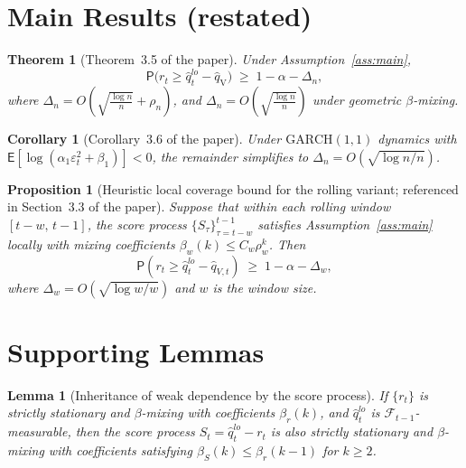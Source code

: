 \documentclass[11pt]{article}
\newcommand{\E}{\mathsf{E}}
\renewcommand{\P}{\mathsf{P}}
\newcommand{\qV}{\hat{q}_{\scriptscriptstyle\mathrm{V}}}
\newtheorem{theorem}{Theorem}
\newtheorem{corollary}{Corollary}
\newtheorem{proposition}{Proposition}
\newtheorem{lemma}{Lemma}
\begin{document}
\section{Main Results (restated)}

\begin{theorem}[Theorem~3.5 of the paper]
\label{thm:dependent_conformal_var}
Under Assumption~\ref{ass:main},
\[
\P\big(r_{t} \geq \hat{q}_t^{lo} - \qV\big)
\;\geq\; 1 - \alpha - \Delta_n,
\]
where $\Delta_n
= O\!\left(\sqrt{\tfrac{\log n}{n}} + \rho_n\right)$, and
$\Delta_n = O\!\left(\sqrt{\tfrac{\log n}{n}}\right)$ under
geometric $\beta$-mixing.
\end{theorem}

\begin{corollary}[Corollary~3.6 of the paper]
\label{cor:garch_conformal_var}
Under $\mathrm{GARCH}(1,1)$ dynamics with
$\E[\log(\alpha_1 \varepsilon_t^2 + \beta_1)] < 0$, the remainder
simplifies to $\Delta_n = O(\sqrt{\log n / n})$.
\end{corollary}

\begin{proposition}[Heuristic local coverage bound for the rolling
variant; referenced in Section~3.3 of the paper]
\label{prop:rolling_coverage}
Suppose that within each rolling window $[t-w,\,t-1]$, the score
process $\{S_\tau\}_{\tau=t-w}^{t-1}$ satisfies
Assumption~\ref{ass:main} locally with mixing coefficients
$\beta_w(k) \leq C_w \rho_w^k$. Then
\[
\P\!\left(r_t \geq \hat{q}_t^{lo} - \hat{q}_{V,t}\right)
\;\geq\; 1 - \alpha - \Delta_w,
\]
where $\Delta_w = O(\sqrt{\log w / w})$ and $w$ is the window size.
\end{proposition}

\section{Supporting Lemmas}

\begin{lemma}[Inheritance of weak dependence by the score process]
\label{lem:score_mixing}
If $\{r_t\}$ is strictly stationary and $\beta$-mixing with
coefficients $\beta_r(k)$, and $\hat q_t^{lo}$ is
$\mathcal F_{t-1}$-measurable, then the score process
$S_t = \hat q_t^{lo} - r_t$ is also strictly stationary and
$\beta$-mixing with coefficients satisfying
$\beta_S(k) \le \beta_r(k-1)$ for $k \ge 2$.
\end{lemma}
\end{document}
